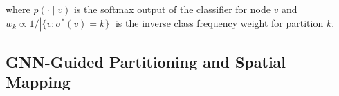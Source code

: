 \documentclass[runningheads]{llncs}
\begin{document}
\noindent where $\hat{p}(\cdot \mid v)$ is the softmax output of the classifier for node $v$ and $w_k \propto 1/|\{v : \sigma^*(v) = k\}|$ is the inverse class frequency weight for partition $k$.



\subsection{GNN-Guided Partitioning and Spatial Mapping}\label{subsec:guided_repair}
%





\end{document}
